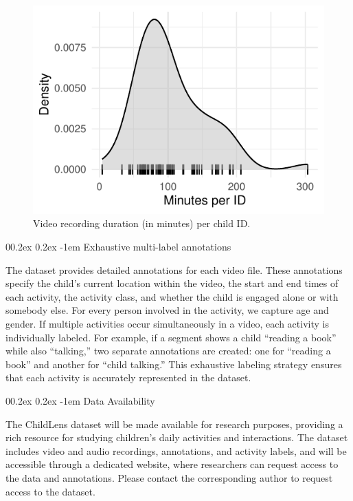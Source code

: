 \documentclass[
  man,floatsintext]{apa6}
\makeatletter
\let\oldparagraph\paragraph
\renewcommand{\paragraph}{
    \@ifstar
      \xxxParagraphStar
      \xxxParagraphNoStar
  }
\newcommand{\xxxParagraphStar}[1]{\oldparagraph*{#1}\mbox{}}
\newcommand{\xxxParagraphNoStar}[1]{\oldparagraph{#1}\mbox{}}
\renewcommand{\paragraph}{\@startsection{paragraph}{4}{\parindent}%
  {0\baselineskip \@plus 0.2ex \@minus 0.2ex}%
  {-1em}%
  {\normalfont\normalsize\bfseries\itshape\typesectitle}}
\makeatother
\begin{document}
\begin{figure}
\centering
\includegraphics{ChildLens_paper_files/figure-latex/minutes-per-child-1.pdf}
\caption{\label{fig:minutes-per-child}Video recording duration (in minutes) per child ID.}
\end{figure}

\paragraph{Exhaustive multi-label annotations}\label{exhaustive-multi-label-annotations}

The dataset provides detailed annotations for each video file. These annotations specify the child's current location within the video, the start and end times of each activity, the activity class, and whether the child is engaged alone or with somebody else. For every person involved in the activity, we capture age and gender. If multiple activities occur simultaneously in a video, each activity is individually labeled. For example, if a segment shows a child ``reading a book'' while also ``talking,'' two separate annotations are created: one for ``reading a book'' and another for ``child talking.'' This exhaustive labeling strategy ensures that each activity is accurately represented in the dataset.

\paragraph{Data Availability}\label{data-availability}

The ChildLens dataset will be made available for research purposes, providing a rich resource for studying children's daily activities and interactions. The dataset includes video and audio recordings, annotations, and activity labels, and will be accessible through a dedicated website, where researchers can request access to the data and annotations.
Please contact the corresponding author to request access to the dataset.
\end{document}
